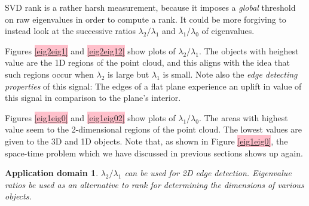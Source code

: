 \documentclass[a4paper,11pt,twoside]{article}
\newtheorem*{appdom}{Application domain}
\theoremstyle{definition}
\theoremstyle{remark}
\newcommand{\sh}[1]{\colorbox{pink}{#1}}
\newcommand{\lnk}[1]{\sh{\hyperref[#1]{\ref*{#1}}}}
\newenvironment{app}
   {\colorlet{shadecolor}{red!50}\begin{shaded}\begin{appdom}}
   {\end{appdom}\end{shaded}}
\begin{document}
SVD rank is a rather harsh measurement, because it imposes a \emph{global} threshold on raw eigenvalues in order to compute a rank. It could be more forgiving to instead look at the successive ratios $\lambda_2/\lambda_1$ and $\lambda_1/\lambda_0$ of eigenvalues. 

Figures \lnk{eig2eig1} and \lnk{eig2eig12} show plots of $\lambda_2/\lambda_1$. The objects with heighest value are the 1D regions of the point cloud, and this aligns with the idea that such regions occur when $\lambda_2$ is large but $\lambda_1$ is small. Note also the \emph{edge detecting properties} of this signal: The edges of a flat plane experience an uplift in value of this signal in comparison to the plane's interior. 

Figures \lnk{eig1eig0} and \lnk{eig1eig02} show plots of $\lambda_1/\lambda_0$. The areas with highest value seem to the 2-dimensional regions of the point cloud. The lowest values are given to the 3D and 1D objects. Note that, as shown in Figure \lnk{eig1eig0}, the space-time problem which we have discussed in previous sections shows up again.
\begin{app}$\lambda_2/\lambda_1$ can be used for 2D edge detection. Eigenvalue ratios be used as an alternative to rank for determining the dimensions of various objects.
\end{app}
\end{document}
